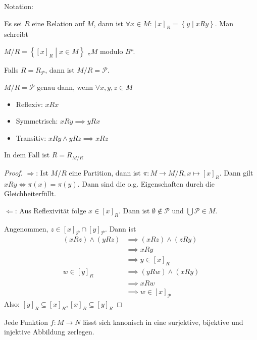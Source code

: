 \begin{remark}
  Notation:

  Es sei $R$ eine Relation auf $M$, dann ist $\forall x \in M: [x]_R = \left\{ y \middle| x R y \right\}$. Man schreibt

  $M / R = \left\{ [x]_R \middle| x \in M \right\}$ „$M$ modulo $B$“.

  Falls $R = R_{\mathscr{P}}$, dann ist $M/R = \mathscr{P}$.
\end{remark}
\begin{theorem}
  $M/R = \mathscr{P}$ genau dann, wenn $\forall x, y, z \in M$
  \begin{itemize}
  \item Reflexiv: $x R x$
  \item Symmetrisch: $x R y \implies y R x$
  \item Transitiv: $x R y \wedge y R z \implies x R z$
  \end{itemize}
  In dem Fall ist $R = R_{M/R}$
\end{theorem}
\begin{proof}
  $\Rightarrow$: Ist $M/R$ eine Partition, dann ist $\pi: M \to M/R, x \mapsto [x]_R$. Dann gilt $x R y \iff \pi(x) = \pi(y)$. Dann sind die o.g. Eigenschaften durch die Gleichheiterfüllt.

  $\Leftarrow$: Aus Reflexivität folge $x \in [x]_R$. Dann ist $\emptyset \not\in \mathscr{P}$ und $\bigcup \mathscr{P} \in M$.

  Angenommen, $z \in [x]_{\mathscr{P}} \cap [y]_{\mathscr{P}}$. Dann ist
  \begin{align*}
    (x R z) \wedge (y R z) &\implies (x R z) \wedge (z R y) \\
    \, &\implies x R y \\
    \, &\implies y \in [x]_{R} \\
    w \in [y]_R &\implies (y R w) \wedge (x R y) \\
    \, &\implies x R w \\
    \, &\implies w \in [x]_{\mathscr{P}}
  \end{align*}
  Also: $[y]_R \subseteq [x]_R, [x]_R \subseteq [y]_{R}$
\end{proof}

\begin{theorem}
  Jede Funktion $f: M \to N$ lässt sich kanonisch in eine surjektive, bijektive und injektive Abbildung zerlegen.
\end{theorem}